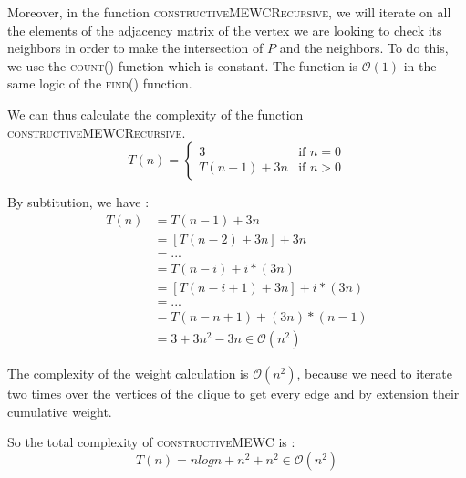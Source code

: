 Moreover, in the function \textsc{constructiveMEWCRecursive}, we will iterate on all the elements of the adjacency matrix of the vertex we are looking to check its neighbors in order to make the intersection of $P$ and the neighbors. To do this, we use the \textsc{count()} function which is constant\footnotemark. The function is $\mathcal{O}(1)$ in the same logic of the \textsc{find()} function.
\bigskip

We can thus calculate the complexity of the function \textsc{constructiveMEWCRecursive}. 
\begin{equation}
    T(n)=\begin{cases}
        3        & \text{if } n=0 \\
        T(n-1) + 3n & \text{if } n>0
    \end{cases}
\end{equation}

By subtitution, we have :
\begin{align}
    T(n)&=T(n-1)+3n\\
    &=[T(n-2)+3n]+3n\\
    &=...\\
    &=T(n - i) + i*(3n) \\
    &=[T(n - i  + 1) + 3n] + i*(3n) \\
    &=...\\
    &=T(n - n + 1)+(3n)*(n-1) \\
    &= 3 + 3n^2 - 3n \in \mathcal{O}(n^2)
\end{align}

The complexity of the weight calculation is $\mathcal{O}(n^2)$, because we need to iterate two times over the vertices of the clique to get every edge and by extension their cumulative weight.
\bigskip

So the total complexity of \textsc{constructiveMEWC} is : 
$$ T(n) = n logn + n^2 + n^2 \in \mathcal{O}(n^2) $$